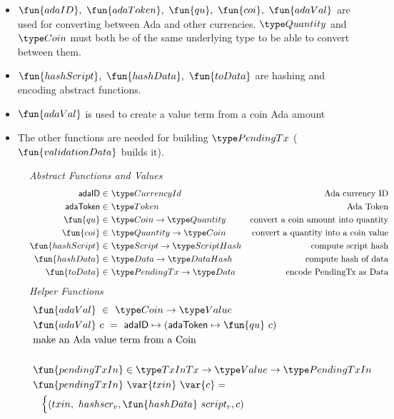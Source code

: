 \begin{itemize}
  \item $\fun{adaID},~\fun{adaToken},~\fun{qu},~\fun{coi},~\fun{adaVal}$ are used
  for converting between Ada and other currencies. $\Quantity$ and $\Coin$
  must both be of the same underlying type to be able to convert between them.
  \item $\fun{hashScript},~ \fun{hashData},~\fun{toData}$ are hashing and encoding
  abstract functions.
  \item $\fun{adaVal}$ is used to create a value term from a coin Ada amount
  \item The other functions are needed for building $\PendingTx$
  ($\fun{validationData}$ builds it).
\end{itemize}

\begin{figure*}[htb]
  \emph{Abstract Functions and Values}
  \begin{align*}
    \mathsf{adaID} \in& ~\CurrencyId
    & \text{Ada currency ID} \\
    \mathsf{adaToken} \in& ~\Token
    & \text{Ada Token} \\
    \fun{qu} \in& ~\Coin \to \Quantity
    & \text{convert a coin amount into quantity} \\
    \fun{coi} \in& ~\Quantity \to \Coin
    & \text{convert a quantity into a coin value} \\
    \fun{hashScript} \in & ~\Script\to \HashScr
    & \text{compute script hash} \\
    \fun{hashData} \in & ~\Data \to \HashDat
    & \text{compute hash of data} \\
    \fun{toData} \in & ~\PendingTx\to \Data
    & \text{encode PendingTx as Data} \\
  \end{align*}
  \emph{Helper Functions}
  \begin{align*}
    &\fun{adaVal} ~\in~ \Coin \to \Value \\
    &\fun{adaVal}~{c} ~=~ \mathsf{adaID} \mapsto (\mathsf{adaToken} \mapsto  \fun{qu}~c) \\
    & \text{make an Ada value term from a Coin} \\~\\
    & \fun{pendingTxIn} \in \TxInTx \to \Value \to \PendingTxIn \\
    & \fun{pendingTxIn}~\var{txin}~\var{c} = \\
    & ~~\begin{cases}
          (txin,~{hashscr_v},\fun{hashData}~{script_r},c)

\end{cases}
\end{align*}
\end{figure*}
